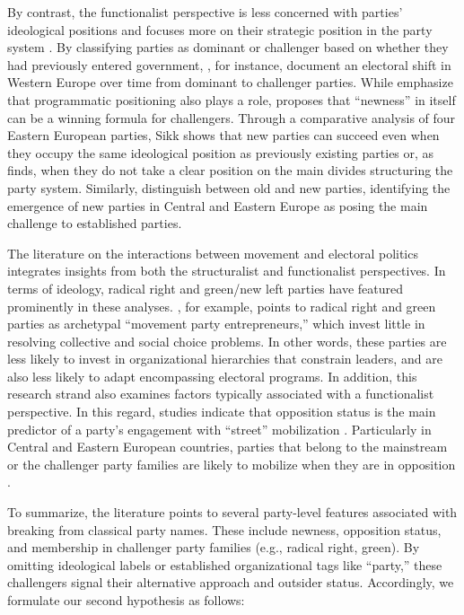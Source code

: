 \documentclass[12pt]{article}
\begin{document}
By contrast, the functionalist perspective is less concerned with parties' ideological positions and focuses more on their strategic position in the party system \citep[e.g.,][]{Bertoa_Enyedi_2021}. By classifying parties as dominant or challenger based on whether they had previously entered government, \citet{deVries_Hobolt_2020}, for instance, document an electoral shift in Western Europe over time from dominant to challenger parties. While \citet{deVries_Hobolt_2020} emphasize that programmatic positioning also plays a role, \citet{Sikk_2011} proposes that ``newness'' in itself can be a winning formula for challengers. Through a comparative analysis of four Eastern European parties, Sikk shows that new parties can succeed even when they occupy the same ideological position as previously existing parties or, as \citet{Engler_2023} finds, when they do not take a clear position on the main divides structuring the party system. Similarly, \citet{Haughton_Deegan_Krause_2020} distinguish between old and new parties, identifying the emergence of new parties in Central and Eastern Europe as posing the main challenge to established parties.

The literature on the interactions between movement and electoral politics integrates insights from both the structuralist and functionalist perspectives. In terms of ideology, radical right \citep[e.g.,][]{Castelli_Gattinara_Pirro_2024} and green/new left parties \citep[e.g.,][]{Blings_2020, della_Porta_et_al_2017} have featured prominently in these analyses. \citet{Kitschelt_2006}, for example, points to radical right and green parties as archetypal “movement party entrepreneurs,” which invest little in resolving collective and social choice problems. In other words, these parties are less likely to invest in organizational hierarchies that constrain leaders, and are also less likely to adapt encompassing electoral programs. In addition, this research strand also examines factors typically associated with a functionalist perspective. In this regard, studies indicate that opposition status is the main predictor of a party's engagement with ``street'' mobilization \citep{Hutter_Vliegenthart_2018}. Particularly in Central and Eastern European countries, parties that belong to the mainstream or the challenger party families are likely to mobilize when they are in opposition \citep{Borbath_Hutter_2021}.

To summarize, the literature points to several party-level features associated with breaking from classical party names. These include newness, opposition status, and membership in challenger party families (e.g., radical right, green). By omitting ideological labels or established organizational tags like “party,” these challengers signal their alternative approach and outsider status. Accordingly, we formulate our second hypothesis as follows:
\end{document}
